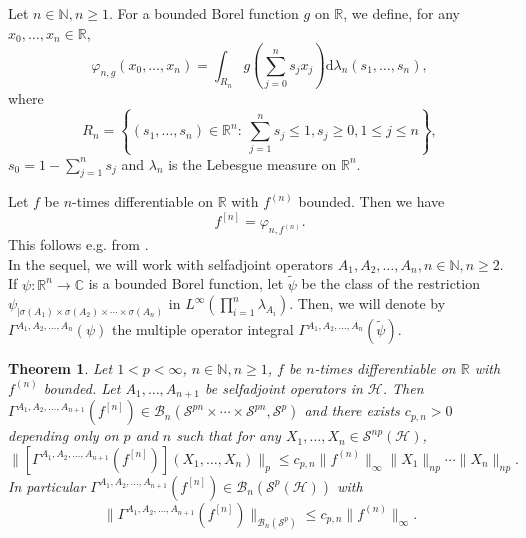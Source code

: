 \documentclass[12pt]{amsart}
\newtheorem{theorem}{Theorem}[section]
\theoremstyle{remark}
\begin{document}
Let $n \in \mathbb{N}, n\geq 1$. For a bounded Borel function $g$ on $\mathbb{R}$, we define, for any $x_0, \ldots, x_n \in \mathbb{R}$,
$$
\varphi_{n,g}(x_0, \ldots, x_n) = \int_{R_n} g\left( \sum_{j=0}^n s_j x_j \right) \text{d}\lambda_n (s_1, \ldots, s_n),
$$
where
$$
R_n = \left\lbrace (s_1,\ldots, s_n) \in \mathbb{R}^n : \ \sum_{j=1}^n s_j \leq 1, s_j \geq 0, 1\leq j \leq n \right\rbrace,
$$
$s_0=1-\sum_{j=1}^n s_j$ and $\lambda_n$ is the Lebesgue measure on $\mathbb{R}^n$.

Let $f$ be $n$-times differentiable on $\mathbb{R}$ with $f^{(n)}$ bounded. Then we have
\begin{equation}\label{DDint}
f^{[n]} = \varphi_{n,f^{(n)}}.
\end{equation}
This follows e.g. from \cite[Formula (7.12)]{DVL}.\\



In the sequel, we will work with selfadjoint operators $A_1, A_2, \ldots, A_n, n\in \mathbb{N}, n\geq 2$. If $\psi : \mathbb{R}^n \rightarrow \mathbb{C}$ is a bounded Borel function, let $\tilde{\psi}$ be the class of the restriction $\psi_{|\sigma(A_1) \times \sigma(A_2) \times \cdots \times \sigma(A_n)}$ in $L^{\infty}\left(\prod_{i=1}^n
\lambda_{A_i}\right)$. Then, we will denote by $\Gamma^{A_1,A_2, \ldots, A_n}(\psi)$ the multiple operator integral $\Gamma^{A_1,A_2, \ldots, A_n}(\tilde{\psi})$.


\vspace{0.5cm}



\begin{theorem}\label{BddnessMOI}
Let $1 < p < \infty$, $n\in\mathbb{N}, n\geq 1$, $f$ be $n$-times differentiable on $\mathbb{R}$ with $f^{(n)}$ bounded. Let $A_1, \ldots, A_{n+1}$ be selfadjoint operators in $\mathcal{H}$. Then $
\Gamma^{A_1,A_2, \ldots, A_{n+1}}(f^{[n]}) \in \mathcal{B}_n(\mathcal{S}^{pn} \times \cdots \times \mathcal{S}^{pn},\mathcal{S}^p)
$
and there exists $c_{p,n} > 0$ depending only on $p$ and $n$ such that for any $X_1,  \ldots, X_n \in \mathcal{S}^{np}(\mathcal{H})$,
\begin{equation}\label{IneqDDn}
\| \left[\Gamma^{A_1,A_2, \ldots, A_{n+1}}(f^{[n]})\right](X_1,\ldots,X_n) \|_p \leq c_{p,n} \|f^{(n)}\|_{\infty}\|X_1\|_{np} \cdots \|X_n\|_{np}.
\end{equation}
In particular $\Gamma^{A_1,A_2, \ldots, A_{n+1}}(f^{[n]}) \in \mathcal{B}_n(\mathcal{S}^p(\mathcal{H}))$ with
\begin{equation}\label{IneqDDn2}
\| \Gamma^{A_1,A_2, \ldots, A_{n+1}}(f^{[n]}) \|_{\mathcal{B}_n(\mathcal{S}^p)} \leq c_{p,n} \|f^{(n)}\|_{\infty}.
\end{equation}
\end{theorem}
\end{document}
